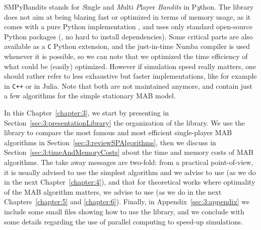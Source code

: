 
SMPyBandits stands for \emph{S}ingle and \emph{M}ulti \emph{P}layer \emph{Bandits} in P\emph{y}thon.
The library does not aim at being blazing fast or optimized in terms of memory usage, as it comes with a pure Python implementation \cite{python}, and uses only standard open-source Python packages (\ie, no hard to install dependencies).
Some critical parts are also available as a \texttt{C} Python extension, and the just-in-time Numba compiler \cite{numba} is used whenever it is possible, so we can note that we optimized the time efficiency of what could be (easily) optimized.
However if simulation speed really matters, one should rather refer to less exhaustive but faster implementations, like for example \cite{TorLibbandit} in \texttt{C++} or \cite{VishMABjl} in Julia. Note that both are not maintained anymore, and contain just a few algorithms for the simple stationary MAB model.

In this Chapter~\ref{chapter:3}, we start by presenting in Section~\ref{sec:3:presentationLibrary} the organization of the library.
We use the library to compare the most famous and most efficient single-player MAB algorithms in Section~\ref{sec:3:reviewSPAlgorithms},
then we discuss in Section~\ref{sec:3:timeAndMemoryCosts} about the time and memory costs of MAB algorithms.
The take away messages are two-fold:
from a practical point-of-view, it is usually advised to use the simplest algorithm and we advise to use \UCB{} (as we do in the next Chapter~\ref{chapter:4}),
and that for theoretical works where optimality of the MAB algorithm matters, we advise to use \klUCB{} (as we do in the next Chapters~\ref{chapter:5} and \ref{chapter:6}).
%
Finally, in Appendix~\ref{sec:3:appendix} we include some small files showing how to use the library, and we conclude with some details regarding the use of parallel computing to speed-up simulations.


